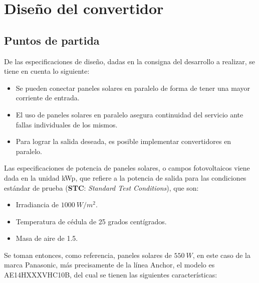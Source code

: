 \clearpage


\section{Diseño del convertidor}

\subsection{Puntos de partida}

De las especificaciones de diseño, dadas en la consigna del desarrollo a realizar, se tiene en cuenta lo siguiente:

\begin{itemize}
	\item Se pueden conectar paneles solares en paralelo de forma de tener una mayor corriente de entrada.
	\item El uso de paneles solares en paralelo asegura continuidad del servicio ante fallas individuales de los mismos.
	\item Para lograr la salida deseada, es posible implementar convertidores en paralelo.
\end{itemize}


Las especificaciones de potencia de paneles solares, o campos fotovoltaicos viene dada en la unidad kWp, que refiere a la potencia de salida para las condiciones estándar de prueba (\textbf{STC}: \textit{Standard Test Conditions}), que son:

\begin{itemize}
	\item Irradiancia de $1000 \ W/m^2$.
	\item Temperatura de cédula de 25 grados centígrados.
	\item Masa de aire de 1.5.
\end{itemize}

Se toman entonces, como referencia, paneles solares de $550 \ W$, en este caso de la marca Panasonic, más precisamente de la línea Anchor, el modelo es AE14HXXXVHC10B, del cual se tienen las siguientes características:

